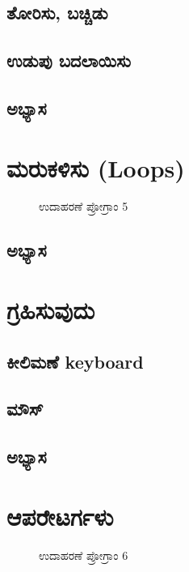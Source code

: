 \documentclass[16pt]{book}
\begin{document}
\section{ತೋರಿಸು, ಬಚ್ಚಿಡು}

\section{ಉಡುಪು ಬದಲಾಯಿಸು}

\section{ಅಭ್ಯಾಸ }

\chapter{ಮರುಕಳಿಸು (\textenglish{Loops})}
\begin{figure}[h]
\begin{Scratch}[1]
\beginbox{}
\end{Scratch}
\caption{ಉದಾಹರಣೆ ಪ್ರೋಗ್ರಾಂ 5}
\end{figure}

\section{ಅಭ್ಯಾಸ }

\chapter{ಗ್ರಹಿಸುವುದು} 

\section{ಕೀಲಿಮಣೆ \textenglish{keyboard}}

\section{ ಮೌಸ್} 

\section{ಅಭ್ಯಾಸ }

\chapter{ಆಪರೇಟರ್ಗಳು}
\begin{figure}[h]
\begin{Scratch}[1]
\beginbox{}
\end{Scratch}
\caption{ಉದಾಹರಣೆ ಪ್ರೋಗ್ರಾಂ 6}
\end{figure}
\end{document}
